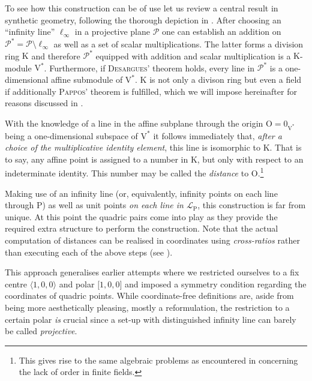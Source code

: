 \documentclass[12pt,english,paper=a4,DIV=12,headings=small,numbers=noenddot,parskip=half]{scrartcl}
\theoremstyle{definition}
\begin{document}
To see how this construction can be of use let us review a central result in synthetic geometry, following the thorough depiction in \cite{Beutelspacher}. After choosing an ``infinity line'' $\ell_\infty$ in a projective plane $\mathscr{P}$ one can establish an addition on $\mathscr{P}^*=\mathscr{P}\setminus\ell_\infty$ as well as a set of scalar multiplications. The latter forms a division ring $\mathrm{K}$ and therefore $\mathscr{P}^*$ equipped with addition and scalar multiplication is a $\mathrm{K}$-module $\mathrm{V}^*$. Furthermore, if \textsc{Desargues}' theorem holds, every line in $\mathscr{P}^*$ is a one-dimensional affine submodule of $\mathrm{V}^*$. $\mathrm{K}$ is not only a divison ring but even a field if additionally \textsc{Pappos}' theorem is fulfilled, which we will impose hereinafter for reasons discussed in \cite{Alex:Th12}.

With the knowledge of a line in the affine subplane through the origin $\mathrm{O}=0_{\mathrm{V}^*}$ being a one-dimensional subspace of $\mathrm{V}^*$ it follows immediately that, \emph{after a choice of the multiplicative identity element}, this line is isomorphic to $\mathrm{K}$. That is to say, any affine point is assigned to a number in $\mathrm{K}$, but only with respect to an indeterminate identity. This number may be called the \emph{distance} to $\mathrm{O}$.\footnote{This gives rise to the same algebraic problems as encountered in \cite{AlKr:2013} concerning the lack of order in finite fields.}

Making use of an infinity line (or, equivalently, infinity points on each line through $\mathrm{P}$) as well as unit points \emph{on each line in $\mathscr{L}_\mathrm{P}$}, this construction is far from unique. At this point the quadric pairs come into play as they provide the required extra structure to perform the construction. Note that the actual computation of distances can be realised in coordinates using \emph{cross-ratios} rather than executing each of the above steps (see \cite{AlKr:2013}).

This approach generalises earlier attempts where we restricted ourselves to a fix centre $\langle1,0,0\rangle$ and polar $\lbrack1,0,0\rbrack$ and imposed a symmetry condition regarding the coordinates of quadric points. While coordinate-free definitions are, aside from being more aesthetically pleasing, mostly a reformulation, the restriction to a certain polar \emph{is} crucial since a set-up with distinguished infinity line can barely be called \emph{projective}.
\end{document}
